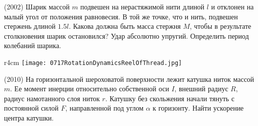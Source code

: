 \AddProb (2002) Шарик массой $m$ подвешен на нерастяжимой нити длиной $l$ и отклонен на малый угол от положения равновесия. 
В той же точке, что и нить, подвешен стержень длиной $1.5l$. Какова должна быть масса стержня $M$, чтобы в результате столкновения шарик остановился? 
Удар абсолютно упругий. Определить период колебаний шарика.

\begin{wrapfigure}{r}{4cm}
\texttt{[image: 0717RotationDynamicsReelOfThread.jpg]}
\end{wrapfigure}

\AddProb (2010) На горизонтальной шероховатой поверхности лежит катушка ниток массой $m$. 
Ее момент инерции относительно собственной оси $I$, внешний радиус $R$, радиус намотанного слоя ниток $r$. 
Катушку без скольжения начали тянуть с постоянной силой $F$, направленной под углом $\alpha$ к горизонту. Найти ускорение центра катушки.